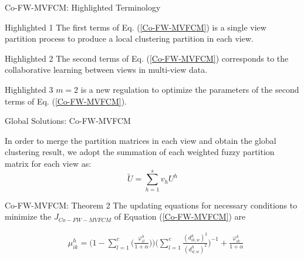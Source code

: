 \documentclass[compress,sky blue]{beamer}
\begin{document}
\begin{frame}{Co-FW-MVFCM: Highlighted Terminology }
\vspace{-0.7cm}
\begin{block}{Highlighted 1}
The first terms of Eq. (\ref{Co-FW-MVFCM}) is a single view partition process to produce a local clustering partition in each view.
\end{block}

\begin{exampleblock}{Highlighted 2}
The second terms of Eq. (\ref{Co-FW-MVFCM}) corresponds to the collaborative learning between views in multi-view data. 
\end{exampleblock}

\begin{alertblock}{Highlighted 3}
$m=2$ is a new regulation to optimize the parameters of the second terms of Eq. (\ref{Co-FW-MVFCM}). 
\end{alertblock}

\end{frame}

\begin{frame}{Global Solutions: Co-FW-MVFCM}
	   
In order to merge the partition matrices in each view and obtain the global clustering result, we adopt the summation of each weighted fuzzy partition matrix for each view as: 
\begin{equation}
\tilde{U} =  \sum_{h=1}^{s} v_{h} U^{h}
\label{GlobalCo} 
\end{equation}

\end{frame}




\begin{frame}{Co-FW-MVFCM: Theorem 2}
The updating equations for necessary conditions to minimize the $J_{Co-FW-MVFCM}$  of Equation (\ref{Co-FW-MVFCM}) are 

\begin{align}
   & \mu_{ik}^{h}=\bigg(1-\sum_{l=1}^{c}\Big(\frac{\varphi_{il}^{h}} {1+\alpha} \Big) \bigg)  \Bigg(\sum_{l=1}^{c} \frac {(d_{ik,w}^{h})^{2}} {(d_{il,w}^{h} )^{2}} \Bigg)^{-1} + \frac{\varphi_{ik}^{h}}{1+\alpha}  
  \label{Theorem2U} 
\end{align}

\end{frame}
\end{document}
